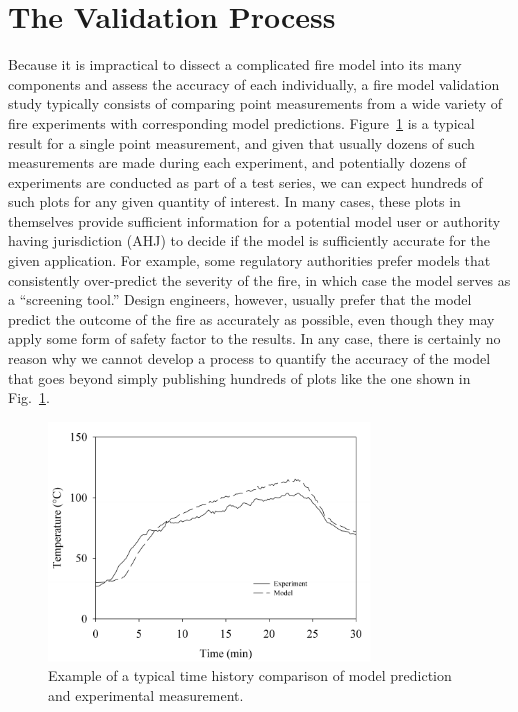 \section{The Validation Process}

Because it is impractical to dissect a complicated fire model into its many components and assess the accuracy of each individually,
a fire model validation study typically consists of comparing point measurements from a wide variety of fire experiments with corresponding model predictions.
Figure~\ref{temp_history} is a typical result for a single point measurement, and given that usually dozens of such measurements are made during each experiment,
and potentially dozens of experiments are conducted as part of a test series, we can expect hundreds of such plots for any given quantity of interest. In many cases, these
plots in themselves provide sufficient information for a potential model user or authority having jurisdiction (AHJ) to decide if the model is sufficiently accurate for the
given application. For example, some regulatory
authorities prefer models that consistently over-predict the severity of the fire, in which case the model serves as a ``screening tool.'' Design engineers, however,
usually prefer that the model predict the outcome of the fire as accurately as possible, even though they may apply some form of safety factor to the results.
In any case, there is certainly no reason why we cannot develop a process to quantify the accuracy of the model that goes beyond simply
publishing hundreds of plots like the one shown in Fig.~\ref{temp_history}.

\begin{figure}[t]
\begin{center}
\includegraphics[height=2.5in]{FIGURES/sample_time_history}
\end{center}
\caption[Sample time history plots.]{Example of a typical time history comparison of model prediction and experimental measurement.}
\label{temp_history}
\end{figure}


